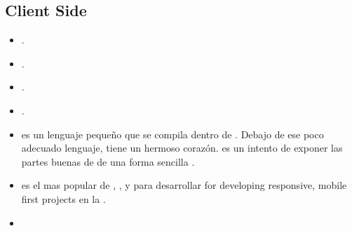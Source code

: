 \subsection{Client Side}
\begin{itemize}
	\item \textbf{\angularjs} \cite{technology_angularjs}.
	\item \textbf{\emberjs}\cite{online_technology_emberjs}.
	\item \textbf{\backbonejs}\cite{online_technology_backbone}.
	
	\item \textbf{\meteor}.
	
	\item \textbf{\coffeescript} es un lenguaje pequeño que se compila dentro de \javascript. Debajo de ese poco adecuado lenguaje, \javascript tiene un hermoso corazón. \coffeescript es un intento de exponer las partes buenas de \javascript de una forma sencilla \cite{technology_coffeescript}.
	
	
	
	\item \textbf{\bootstrap} es el \framework mas popular de \html, \css, y \javascript para desarrollar  for developing responsive, mobile first projects en la \web \cite{technology_bootstrap}.
\end{itemize}

\begin{itemize}

	\item \textbf{\grunttool} \cite{technology_gruntjs}
\end{itemize}


